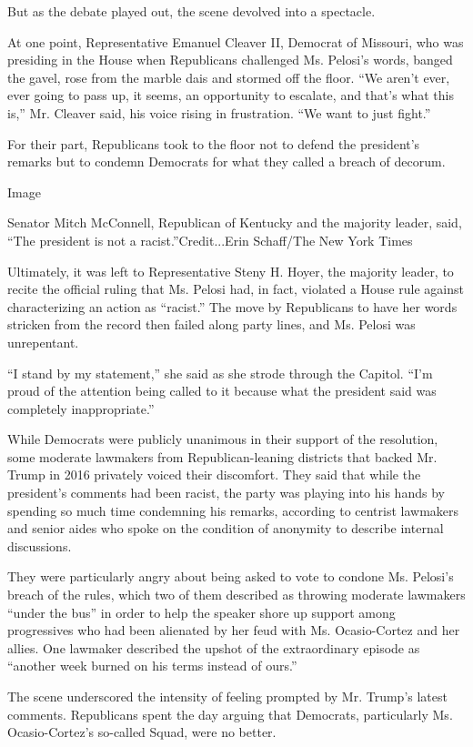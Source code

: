 But as the debate played out, the scene devolved into a spectacle.

At one point, Representative Emanuel Cleaver II, Democrat of Missouri,
who was presiding in the House when Republicans challenged Ms. Pelosi's
words, banged the gavel, rose from the marble dais and stormed off the
floor. ``We aren't ever, ever going to pass up, it seems, an opportunity
to escalate, and that's what this is,'' Mr. Cleaver said, his voice
rising in frustration. ``We want to just fight.''

For their part, Republicans took to the floor not to defend the
president's remarks but to condemn Democrats for what they called a
breach of decorum.

Image

Senator Mitch McConnell, Republican of Kentucky and the majority leader,
said, ``The president is not a racist.''Credit...Erin Schaff/The New
York Times

Ultimately, it was left to Representative Steny H. Hoyer, the majority
leader, to recite the official ruling that Ms. Pelosi had, in fact,
violated a House rule against characterizing an action as ``racist.''
The move by Republicans to have her words stricken from the record then
failed along party lines, and Ms. Pelosi was unrepentant.

``I stand by my statement,'' she said as she strode through the Capitol.
``I'm proud of the attention being called to it because what the
president said was completely inappropriate.''

While Democrats were publicly unanimous in their support of the
resolution, some moderate lawmakers from Republican-leaning districts
that backed Mr. Trump in 2016 privately voiced their discomfort. They
said that while the president's comments had been racist, the party was
playing into his hands by spending so much time condemning his remarks,
according to centrist lawmakers and senior aides who spoke on the
condition of anonymity to describe internal discussions.

They were particularly angry about being asked to vote to condone Ms.
Pelosi's breach of the rules, which two of them described as throwing
moderate lawmakers ``under the bus'' in order to help the speaker shore
up support among progressives who had been alienated by her feud with
Ms. Ocasio-Cortez and her allies. One lawmaker described the upshot of
the extraordinary episode as ``another week burned on his terms instead
of ours.''

The scene underscored the intensity of feeling prompted by Mr. Trump's
latest comments. Republicans spent the day arguing that Democrats,
particularly Ms. Ocasio-Cortez's so-called Squad, were no better.

